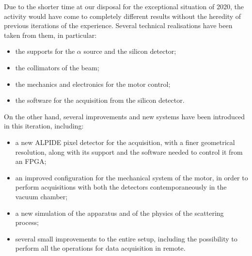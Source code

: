 \documentclass[../../main/main.tex]{subfiles}
\begin{document}
Due to the shorter time at our disposal for the exceptional situation of 2020, the activity would have come to completely different results without the heredity of previous iterations of the experience. Several technical realisations have been taken from them, in particular:
\begin{itemize}
    \item the supports for the \( \alpha \) source and the silicon detector;
    \item the collimators of the beam;
    \item the mechanics and electronics for the motor control;
    \item the software for the acquisition from the silicon detector.
\end{itemize}
On the other hand, several improvements and new systems have been introduced in this iteration, including:
\begin{itemize}
    \item a new ALPIDE pixel detector for the acquisition, with a finer geometrical resolution, along with its support and the software needed to control it from an FPGA;
    \item an improved configuration for the mechanical system of the motor, in order to perform acquisitions with both the detectors contemporaneously in the vacuum chamber;
    \item a new simulation of the apparatus and of the physics of the scattering process;
    \item several small improvements to the entire setup, including the possibility to perform all the operations for data acquisition in remote.
\end{itemize}
\end{document}
